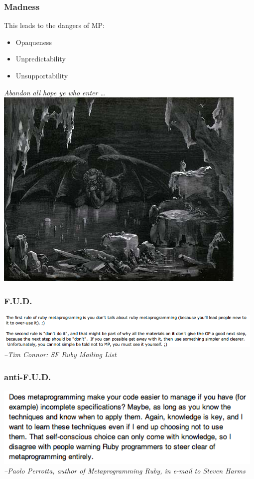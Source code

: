 \documentclass[slidestop,compress,mathserif,notes]{beamer}
\begin{document}
\begin{frame}
	\frametitle{Madness}
	This leads to the dangers of MP:
	\begin{itemize}
		\item Opaqueness
		\item Unpredictability
		\item Unsupportability
	\end{itemize}
	\begin{center}
			\emph{Abandon all hope ye who enter \ldots}
		\includegraphics[scale=0.45]{img/dante.jpg}		
	\end{center}
\end{frame}

\begin{frame}
	\frametitle{F.U.D.}
		\includegraphics[width=0.98\textwidth, height=0.25\textheight]{img/tim_hates_mp.png}		
		\vskip 0.5cm
		\emph{--Tim Connor:  SF Ruby Mailing List}
\end{frame}

\begin{frame}
	\frametitle{anti-F.U.D.}
		\includegraphics[width=0.98\textwidth, height=0.45\textheight]{img/paolo_anti_fud.png}		
		\vskip 0.5cm
		\emph{--Paolo Perrotta, author of Metaprogramming Ruby, in e-mail to Steven Harms}
\end{frame}
\end{document}
